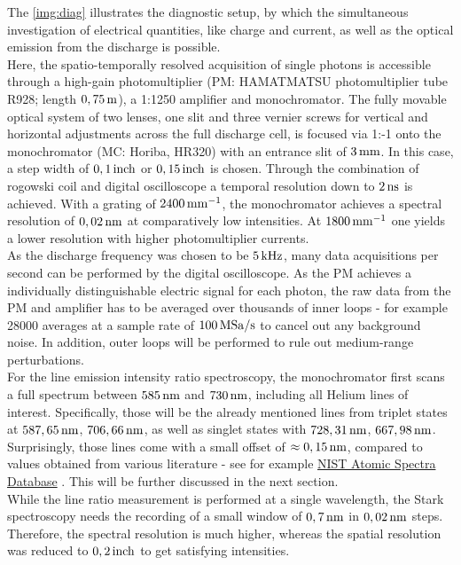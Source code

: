 \documentclass[a4paper,10pt,twoside]{article}
\begin{document}
			The \autoref{img:diag} illustrates the diagnostic setup, by which the simultaneous investigation of electrical quantities, like charge and current, as well as the optical emission from the discharge is possible.\\		Here, the spatio-temporally resolved acquisition of single photons is accessible through a high-gain photomultiplier (PM: HAMATMATSU photomultiplier tube R928; length $\unit[0,75]{m}$), a 1:1250 amplifier and monochromator. The fully movable optical system of two lenses, one slit and three vernier screws for vertical and horizontal adjustments across the full discharge cell, is focused via 1:-1 onto the monochromator (MC: Horiba, HR320) with an entrance slit of $\unit[3]{mm}$. In this case, a step width of $\unit[0,1]{inch}$ or $\unit[0,15]{inch}$ is chosen. Through the combination of rogowski coil and digital oscilloscope a temporal resolution down to $\unit[2]{ns}$ is achieved. With a grating of $\unit[2400]{mm^{-1}}$, the monochromator achieves a spectral resolution of $\unit[0,02]{nm}$ at comparatively low intensities. At $\unit[1800]{mm^{-1}}$ one yields a lower resolution with higher photomultiplier currents.\\
			As the discharge frequency was chosen to be $\unit[5]{kHz}$, many data acquisitions per second can be performed by the digital oscilloscope. As the PM achieves a individually distinguishable electric signal for each photon, the raw data from the PM and amplifier has to be averaged over thousands of inner loops - for example 28000 averages at a sample rate of $\unit[100]{MSa/s}$ to cancel out any background noise. In addition, outer loops will be performed to rule out medium-range perturbations.\\
			For the line emission intensity ratio spectroscopy, the monochromator first scans a full spectrum between $\unit[585]{nm}$ and $\unit[730]{nm}$, including all Helium lines of interest. Specifically, those will be the already mentioned lines from triplet states at $\unit[587,65]{nm}$, $\unit[706,66]{nm}$, as well as singlet states with $\unit[728,31]{nm}$, $\unit[667,98]{nm}$. Surprisingly, those lines come with a small offset of $\approx\unit[0,15]{nm}$, compared to values obtained from various literature - see for example \href{http://www.nist.gov/pml/data/asd.cfm}{NIST Atomic Spectra Database} \cite{NIST_ASD}. This will be further discussed in the next section.\\
			While the line ratio measurement is performed at a single wavelength, the Stark spectroscopy needs the recording of a small window of $\unit[0,7]{nm}$ in $\unit[0,02]{nm}$ steps. Therefore, the spectral resolution is much higher, whereas the spatial resolution was reduced to $\unit[0,2]{inch}$ to get satisfying intensities.\\
\end{document}
